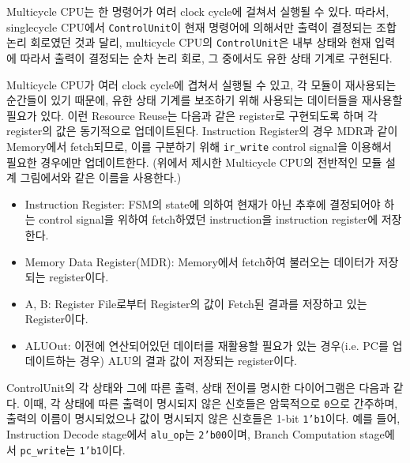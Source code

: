 \documentclass[openright, a4paper]{article}
\newcommand{\code}[1]{\texttt{#1}}
\begin{document}
\hfill

Multicycle CPU는 한 명령어가 여러 clock cycle에 걸쳐서 실행될 수 있다. 따라서,
singlecycle CPU에서 \code{ControlUnit}이 현재 명령어에 의해서만 출력이 결정되는
조합 논리 회로였던 것과 달리, multicycle CPU의 \code{ControlUnit}은 내부 상태와
현재 입력에 따라서 출력이 결정되는 순차 논리 회로, 그 중에서도 유한 상태 기계로
구현된다.

\hfill

Multicycle CPU가 여러 clock cycle에 겹쳐서 실행될 수 있고, 각 모듈이 재사용되는 순간들이 있기 때문에, 유한 상태 기계를 보조하기 위해 사용되는 데이터들을 재사용할 필요가 있다.
이런 Resource Reuse는 다음과 같은 register로 구현되도록 하며 각 register의 값은 동기적으로 업데이트된다.
Instruction Register의 경우 MDR과 같이 Memory에서 fetch되므로, 이를 구분하기 위해 \code{ir_write} control signal을 이용해서 필요한 경우에만 업데이트한다.
(위에서 제시한 Multicycle CPU의 전반적인 모듈 설계 그림에서와 같은 이름을 사용한다.)

\begin{itemize}
    \item Instruction Register: FSM의 state에 의하여 현재가 아닌 추후에 결정되어야 하는 control signal을 위하여 fetch하였던 instruction을 instruction register에 저장한다.
    \item Memory Data Register(MDR): Memory에서 fetch하여 불러오는 데이터가 저장되는 register이다.
    \item A, B: Register File로부터 Register의 값이 Fetch된 결과를 저장하고 있는 Register이다.
    \item ALUOut: 이전에 연산되어있던 데이터를 재활용할 필요가 있는 경우(i.e. PC를 업데이트하는 경우) ALU의 결과 값이 저장되는 register이다.
\end{itemize}

\hfill

ControlUnit의 각 상태와 그에 따른 출력, 상태 전이를 명시한
다이어그램은 다음과 같다. 이때, 각 상태에 따른 출력이 명시되지 않은 신호들은
암묵적으로 \code{0}으로 간주하며, 출력의 이름이 명시되었으나 값이 명시되지 않은
신호들은 1-bit \code{1'b1}이다. 예를 들어, Instruction Decode stage에서
\code{alu_op}는 \code{2'b00}이며, Branch Computation stage에서 \code{pc_write}는
\code{1'b1}이다.
\end{document}
